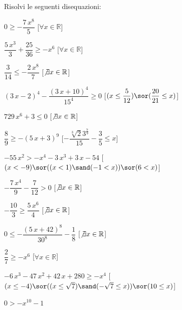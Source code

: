 \begin{esercizio}\label{ese:03.1}
Risolvi le seguenti disequazioni:
\begin{enumeratea}
\item \(0\geq -{\dfrac{7\,{x}^{8}}{5}}\) 
\hfill [\(\forall x \in \mathbb{R}\)]
\item \({\dfrac{5\,{x}^{3}}{3}}+{\dfrac{25}{36}}\geq -{x}^{6}\) 
\hfill [\(\forall x \in \mathbb{R}\)]
\item \({\dfrac{3}{14}}\leq -{\dfrac{2\,{x}^{8}}{7}}\) 
\hfill [\(\not\exists x \in \mathbb{R}\)]
\item \( \left( 3\,x-2 \right) ^{4}-{\dfrac{ \left( 3\,x+10 \right) 
^{4}}{15^4}}\geq 0\) 
\hfill [\((x\leq {\dfrac{5}{12}})\sor ({\dfrac{20}{21}}\leq x)\)]
\item \(729\,{x}^{6}+3\leq 0\) 
\hfill [\(\not\exists x \in \mathbb{R}\)]
\item \({\dfrac{8}{9}}\geq - \left( 5\,x+3 \right) ^{9}\) 
\hfill [\(-{\dfrac{\sqrt [3]{2}{3}^{{\frac{7}{9}}}}{15}}-{\dfrac
{3}{5}}\leq x\)]
\item \(-55\,{x}^{2}>-{x}^{4}-3\,{x}^{3}+3\,x-54\) 
\hfill [\((x<-9)\sor ((x<1) \sand (-1<x))\sor (6<x)\)]
\item \(-{\dfrac{7\,{x}^{4}}{9}}-{\dfrac{7}{12}}>0\) 
\hfill [\(\not\exists x \in \mathbb{R}\)]
\item \(-{\dfrac{10}{3}}\geq {\dfrac{5\,{x}^{6}}{4}}\) 
\hfill [\(\not\exists x \in \mathbb{R}\)]
\item \(0\leq -{\dfrac{ \left( 5\,x+42 \right) ^{8}}{30^8}}-{\dfrac
{1}{8}}\) 
\hfill [\(\not\exists x \in \mathbb{R}\)]
\item \({\dfrac{2}{7}}\geq -{x}^{6}\) 
\hfill [\(\forall x \in \mathbb{R}\)]
\item \(-6\,{x}^{3}-47\,{x}^{2}+42\,x+280\geq -{x}^{4}\) 
\hfill [\((x\leq -4)\sor ((x\leq \sqrt {7}) \sand (-\sqrt {7}\leq x))\sor 
(10\leq x)\)]
\item \(0>-{x}^{10}-1\) 

\end{enumeratea}
\end{esercizio}
